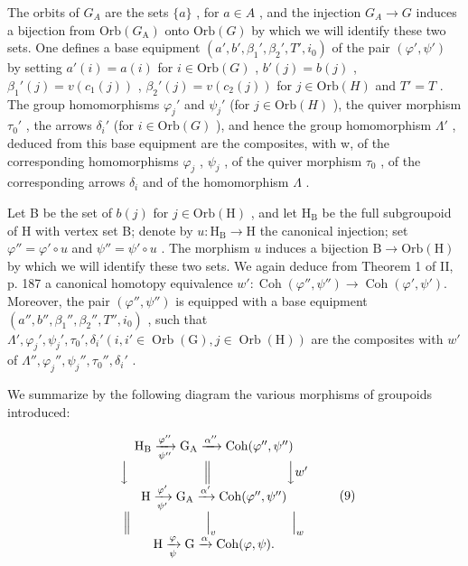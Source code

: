 The orbits of \(G_{A}\) are the sets \(\{a\}\) , for \(a \in A\) , and the injection \(G_{A} \to G\) induces a bijection from \(\mathrm{Orb}(G_{\mathrm{A}})\) onto \(\mathrm{Orb}(G)\) by which we will identify these two sets. One defines a base equipment \((a', b', \beta_{1}', \beta_{2}', T', i_{0})\) of the pair \((\varphi', \psi')\) by setting \(a'(i) = a(i)\) for \(i \in \mathrm{Orb}(G)\) , \(b'(j) = b(j)\) , \(\beta_{1}'(j) = v(c_{1}(j))\) , \(\beta_{2}'(j) = v(c_{2}(j))\) for \(j \in \mathrm{Orb}(H)\) and \(T' = T\) . The group homomorphisms \(\varphi_{j}'\) and \(\psi_{j}'\) (for \(j \in \mathrm{Orb}(H)\) ), the quiver morphism \(\tau_{0}'\) , the arrows \(\delta_{i}'\) (for \(i \in \mathrm{Orb}(G)\) ), and hence the group homomorphism \(\Lambda'\) , deduced from this base equipment are the composites, with w, of the corresponding homomorphisms \(\varphi_{j}\) , \(\psi_{j}\) , of the quiver morphism \(\tau_{0}\) , of the corresponding arrows \(\delta_{i}\) and of the homomorphism \(\Lambda\) .

Let B be the set of \(b(j)\) for \(j \in \mathrm{Orb}(\mathrm{H})\) , and let \(\mathrm{H}_{\mathrm{B}}\) be the full subgroupoid of H with vertex set B; denote by \(u: \mathrm{H}_{\mathrm{B}} \to \mathrm{H}\) the canonical injection; set \(\varphi'' = \varphi' \circ u\) and \(\psi'' = \psi' \circ u\) . The morphism \(u\) induces a bijection \(\mathrm{B} \to \mathrm{Orb}(\mathrm{H})\) by which we will identify these two sets. We again deduce from Theorem 1 of II, p. 187 a canonical homotopy equivalence \(w': \operatorname{Coh}(\varphi'', \psi'') \to \operatorname{Coh}(\varphi', \psi')\). Moreover, the pair \((\varphi'', \psi'')\) is equipped with a base equipment \((a'', b'', \beta_1'', \beta_2'', T'', i_0)\) , such that \(\Lambda', \varphi_j', \psi_j', \tau_0', \delta_i' (i, i' \in \operatorname{Orb}(\mathrm{G}), j \in \operatorname{Orb}(\mathrm{H}))\) are the composites with \(w'\) of \(\Lambda'', \varphi_j'', \psi_j'', \tau_0'', \delta_i'\) .

We summarize by the following diagram the various morphisms of groupoids introduced:

\[
\begin{array}{c} \mathrm {H_ {B}} \xrightarrow [ \psi^ {\prime \prime} ]{\varphi^ {\prime \prime}} \mathrm {G_ {A}} \xrightarrow {\alpha^ {\prime \prime}} \mathrm{Coh} (\varphi^ {\prime \prime}, \psi^ {\prime \prime}) \\ \Big \downarrow \qquad \qquad \qquad \Big \| \qquad \qquad \qquad \Big \downarrow w ^ {\prime} \\ \mathrm{H} \xrightarrow [ \psi^ {\prime} ]{\varphi^ {\prime}} \mathrm {G_ {A}} \xrightarrow {\alpha^ {\prime}} \mathrm{Coh} (\varphi^ {\prime \prime}, \psi^ {\prime \prime}) \\ \Big \| \qquad \qquad \qquad \Big | _ {v} \qquad \qquad \qquad \Big | _ {w} \\ \mathrm{H} \xrightarrow [ \psi ]{\varphi} \mathrm{G} \xrightarrow {\alpha} \mathrm{Coh} (\varphi , \psi)  . \end{array}\tag{9}
\]

